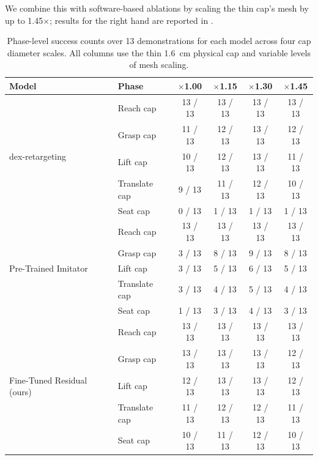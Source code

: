 We combine this with software-based ablations by scaling the thin cap's mesh by up to
1.45$\times$; results for the right hand are reported in
.

\begin{table}[H]
    \centering
    \begin{tabular}{llcccc}
        \toprule
        \textbf{Model} & \textbf{Phase} & $\times$\textbf{1.00} & $\times$\textbf{1.15} & $\times$\textbf{1.30} & $\times$\textbf{1.45} \\
        \midrule
        \multirow{5}{*}{dex-retargeting}
            & Reach cap     & 13 / 13 & 13 / 13 & 13 / 13 & 13 / 13 \\
            & Grasp cap     & 11 / 13 & 12 / 13 & 13 / 13 & 12 / 13 \\
            & Lift cap      & 10 / 13 & 12 / 13 & 13 / 13 & 11 / 13 \\
            & Translate cap &  9 / 13 & 11 / 13 & 12 / 13 & 10 / 13 \\
            & Seat cap      &  0 / 13 &  1 / 13 &  1 / 13 &  1 / 13 \\
        \midrule
        \multirow{5}{*}{Pre-Trained Imitator}
            & Reach cap     & 13 / 13 & 13 / 13 & 13 / 13 & 13 / 13 \\
            & Grasp cap     &  3 / 13 &  8 / 13 &  9 / 13 &  8 / 13 \\
            & Lift cap      &  3 / 13 &  5 / 13 &  6 / 13 &  5 / 13 \\
            & Translate cap &  3 / 13 &  4 / 13 &  5 / 13 &  4 / 13 \\
            & Seat cap      &  1 / 13 &  3 / 13 &  4 / 13 &  3 / 13 \\
        \midrule
        \multirow{5}{*}{Fine-Tuned Residual (ours)}
            & Reach cap     & 13 / 13 & 13 / 13 & 13 / 13 & 13 / 13 \\
            & Grasp cap     & 13 / 13 & 13 / 13 & 13 / 13 & 12 / 13 \\
            & Lift cap      & 12 / 13 & 13 / 13 & 13 / 13 & 12 / 13 \\
            & Translate cap & 11 / 13 & 12 / 13 & 12 / 13 & 11 / 13 \\
            & Seat cap      & 10 / 13 & 11 / 13 & 12 / 13 & 10 / 13 \\
        \bottomrule
    \end{tabular}
    \caption{Phase-level success counts over 13 demonstrations for each model across four cap
    diameter scales. All columns use the thin \SI{1.6}{\centi\meter} physical cap and variable levels of mesh scaling.}
    \label{tab:cap_ablation}
\end{table}

